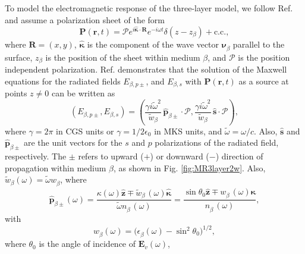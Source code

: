 \documentclass[aps,prb,10pt,showpacs,letterpaper,twocolumn]{revtex4-1}
\begin{document}
To model the electromagnetic response of the three-layer model, we follow Ref.
 and assume a polarization sheet of the form
\begin{equation}\label{eq:psheet}
\mathbf{P}(\mathbf{r},t) = \boldsymbol{\mathcal{P}}
e^{i\hat{\boldsymbol{\kappa}}\cdot
\mathbf{R}}e^{-i\omega t}\delta(z - z_{\beta}) 
+ \mathrm{c.c.},
\end{equation}
where $\mathbf{R}=(x,y)$, $\hat{\boldsymbol{\kappa}}$ is the component of the
wave vector $\boldsymbol{\nu}^{\phantom{a}}_{\beta}$ parallel to the surface,
$z_{\beta}$ is the position of the sheet within medium $\beta$, and
$\boldsymbol{\mathcal{P}}$ is the position independent polarization. Ref.
 demonstrates that the solution of the Maxwell equations
for the radiated fields $E_{\beta,p\pm}$, and $E_{\beta,s}$ with
$\mathbf{P}(\mathbf{r},t)$ as a source at points $z\neq 0$ can be written as
\begin{equation}\label{eq:solmaxwell}
(E_{\beta,p\pm},E_{\beta,s}) = 
(\frac{\gamma i\tilde{\omega}^2}{\tilde{w}_{\beta}}
\,\hat{\mathbf{p}}_{\beta\pm}\cdot\boldsymbol{\mathcal{P}},
\frac{\gamma i\tilde{\omega}^2}{\tilde{w}_{\beta}}
\,\hat{\mathbf{s}}\cdot\boldsymbol{\mathcal{P}}),
\end{equation} 
where $\gamma=2\pi$ in CGS units or $\gamma=1/2\epsilon_{0}$ in MKS units, and
$\tilde{\omega}=\omega/c$. Also, $\hat{\mathbf{s}}$ and
$\hat{\mathbf{p}}_{\beta\pm}$ are the unit vectors for the $s$ and $p$
polarizations of the radiated field, respectively. The $\pm$ refers to upward
($+$) or downward ($-$) direction of propagation within medium $\beta$, as shown
in Fig. \ref{fig:MR3layer2w}. Also,
$\tilde{w}^{\phantom{a}}_{\beta}(\omega)=\tilde{\omega}w^{\phantom{a}}_{\beta}$,
where
\begin{equation}\label{eq:r4}
\hat{\mathbf{p}}^{\phantom{A}}_{\beta\pm}(\omega) =
  \frac{\kappa(\omega)\hat{\mathbf{z}}\mp 
  \tilde{w}^{\phantom{A}}_{\beta}(\omega)\hat{\boldsymbol{\kappa}}} 
  {\tilde{\omega} n^{\phantom{A}}_{\beta}(\omega)}
= \frac{\sin\theta_{0}\hat{\mathbf{z}}\mp 
  w^{\phantom{A}}_{\beta}(\omega)\hat{\boldsymbol{\kappa}}} 
  {n^{\phantom{A}}_{\beta}(\omega)},
\end{equation}
with
\begin{equation}\label{eq:wavevector}
w^{\phantom{a}}_{\beta}(\omega) = 
\big(\epsilon^{\phantom{a}}_{\beta}(\omega) - \sin^{2}\theta_{0}\big)^{1/2},
\end{equation}
where $\theta_{0}$ is the angle of incidence of $\mathbf{E}_{v}(\omega)$,
\end{document}
